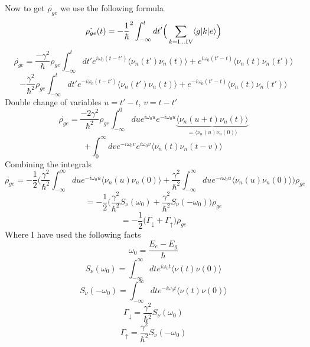 \documentclass[12pt]{article}
\newcommand{\RomanNumeralCaps}[1]
    {\MakeUppercase{\romannumeral #1}}
\begin{document}
Now to get $\dot{\rho_{ge}}$ we use the following formula 
$$ \dot{\rho_{ge}} (t) = - \frac{1}{\hbar}^2 \int_{-\infty}^{t} dt' \Big( \sum_{k = \text{\RomanNumeralCaps{1}} \ldots \text{\RomanNumeralCaps{4}} } \langle g | k | e \rangle \Big) $$ 
$$ \dot{\rho_{ge}} = \frac{- \gamma^2}{\hbar} \rho_{ge} \int_{- \infty}^{t} dt' e^{i \omega_0 (t-t')} \langle \nu_n (t') \nu_n (t) \rangle + e^{i \omega_0 (t'-t)} \langle \nu_n (t) \nu_n (t') \rangle $$
$$ - \frac{\gamma^2}{\hbar^2} \rho_{ge} \int_{- \infty}^t dt' e^{-i \omega_0 (t-t')} \langle \nu_n (t') \nu_n (t) \rangle + e^{-i \omega_0 (t' -t) } \langle \nu_n (t) \nu_n (t') \rangle $$ 
Double change of variables $u = t'-t$, $v=t-t'$ 
$$ \dot{\rho_{ge}} = \frac{-2 \gamma^2}{\hbar^2} \rho_{ge} \int_{- \infty}^0 du e^{i \omega_0 u} e^{-i \omega_0 u} \underbrace{\langle \nu_n (u +t) \nu_n (t) \rangle}_{= \langle \nu_n (u) \nu_n (0) \rangle } $$
$$ + \int_0^{\infty} dv e^{-i \omega_0 v} e^{i \omega_0 v} \langle \nu_n (t) \nu_n (t-v) \rangle $$
Combining the integrals 
$$ \dot{\rho_{ge}} = - \frac{1}{2} \Big( \frac{\gamma^2}{\hbar^2} \int_{- \infty}^{\infty} du e^{-i \omega_0 u} \langle \nu_n (u) \nu_n (0) \rangle + \frac{\gamma^2}{\hbar^2} \int_{- \infty}^{\infty} du e^{-i \omega_0 u} \langle \nu_n (u) \nu_n (0) \rangle \Big) \rho_{ge} $$
$$ = - \frac{1}{2} \Big( \frac{\gamma^2}{\hbar^2} S_{\nu} (\omega_0 ) + \frac{\gamma^2}{\hbar^2} S_{\nu} (- \omega_0 ) \Big)\rho_{ge} $$
$$ = - \frac{1}{2} \big( \Gamma_{\downarrow} + \Gamma_{\uparrow} \big) \rho_{ge} $$
Where I have used the following facts 
$$ \omega_0 = \frac{E_e - E_g}{\hbar} $$
$$ S_{\nu} (\omega_0) = \int_{- \infty}^{\infty} dt e^{i \omega_0 t} \langle \nu (t) \nu (0) \rangle  $$
$$ S_{\nu} ( - \omega_0 ) = \int_{- \infty}^{\infty} dt e^{-i \omega_0 t} \langle \nu (t) \nu (0) \rangle  $$
$$ \Gamma_{\downarrow} = \frac{\gamma^2}{\hbar^2} S_{\nu} (\omega_0) $$
$$ \Gamma_{\uparrow} = \frac{\gamma^2}{\hbar^2} S_{\nu} (- \omega_0) $$
\end{document}
